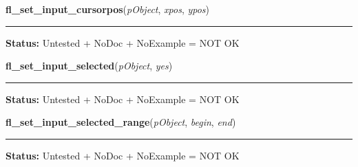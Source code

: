     \label{xformslib:library:fl_set_input_cursorpos}

    \vspace{0.5ex}

\hspace{.8\funcindent}\begin{boxedminipage}{\funcwidth}

    \raggedright \textbf{fl\_set\_input\_cursorpos}(\textit{pObject}, \textit{xpos}, \textit{ypos})

    \vspace{-1.5ex}

    \rule{\textwidth}{0.5\fboxrule}
\setlength{\parskip}{2ex}
\setlength{\parskip}{1ex}
\textbf{Status:} Untested + NoDoc + NoExample = NOT OK



    \end{boxedminipage}

    \label{xformslib:library:fl_set_input_selected}

    \vspace{0.5ex}

\hspace{.8\funcindent}\begin{boxedminipage}{\funcwidth}

    \raggedright \textbf{fl\_set\_input\_selected}(\textit{pObject}, \textit{yes})

    \vspace{-1.5ex}

    \rule{\textwidth}{0.5\fboxrule}
\setlength{\parskip}{2ex}
\setlength{\parskip}{1ex}
\textbf{Status:} Untested + NoDoc + NoExample = NOT OK



    \end{boxedminipage}

    \label{xformslib:library:fl_set_input_selected_range}

    \vspace{0.5ex}

\hspace{.8\funcindent}\begin{boxedminipage}{\funcwidth}

    \raggedright \textbf{fl\_set\_input\_selected\_range}(\textit{pObject}, \textit{begin}, \textit{end})

    \vspace{-1.5ex}

    \rule{\textwidth}{0.5\fboxrule}
\setlength{\parskip}{2ex}
\setlength{\parskip}{1ex}
\textbf{Status:} Untested + NoDoc + NoExample = NOT OK



    \end{boxedminipage}

